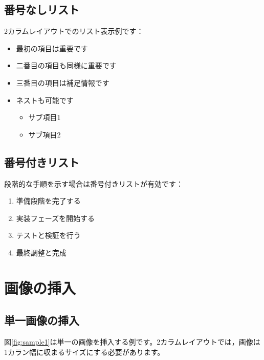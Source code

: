 \documentclass[11pt,a4paper,dvipdfmx,twocolumn]{jarticle}
\begin{document}
\subsection{番号なしリスト}

2カラムレイアウトでのリスト表示例です：

\begin{itemize}
    \item 最初の項目は重要です
    \item 二番目の項目も同様に重要です
    \item 三番目の項目は補足情報です
    \item ネストも可能です
          \begin{itemize}
              \item サブ項目1
              \item サブ項目2
          \end{itemize}
\end{itemize}

\subsection{番号付きリスト}

段階的な手順を示す場合は番号付きリストが有効です：

\begin{enumerate}
    \item 準備段階を完了する
    \item 実装フェーズを開始する
    \item テストと検証を行う
    \item 最終調整と完成
\end{enumerate}

\section{画像の挿入}

\subsection{単一画像の挿入}

図\ref{fig:sample1}は単一の画像を挿入する例です。2カラムレイアウトでは，画像は1カラン幅に収まるサイズにする必要があります。
\end{document}
